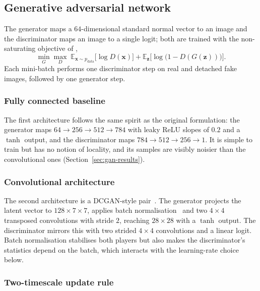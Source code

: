 \documentclass[11pt,a4paper]{article}
\begin{document}
\subsection{Generative adversarial network}
\label{sec:gan}

The generator maps a $64$-dimensional standard normal vector to an image and the discriminator
maps an image to a single logit; both are trained with the non-saturating objective of
\parencite{gan2014},
\begin{equation}
  \min_G \max_D \; \mathbb{E}_{\mathbf{x}\sim p_{\text{data}}}\big[\log D(\mathbf{x})\big]
  + \mathbb{E}_{\mathbf{z}}\big[\log\big(1-D(G(\mathbf{z}))\big)\big].
  \label{eq:gan}
\end{equation}
Each mini-batch performs one discriminator step on real and detached fake images, followed by
one generator step.

\subsubsection{Fully connected baseline}

The first architecture follows the same spirit as the original formulation: the generator maps
$64\to256\to512\to784$ with leaky ReLU slopes of $0.2$ and a $\tanh$ output, and the
discriminator maps $784\to512\to256\to1$.
It is simple to train but has no notion of locality, and its samples are visibly noisier than
the convolutional ones (Section~\ref{sec:gan-results}).

\subsubsection{Convolutional architecture}

The second architecture is a DCGAN-style pair~\parencite{dcgan2016}. The generator projects
the latent vector to $128\times7\times7$, applies batch normalisation~\parencite{bn2015} and
two $4\times4$ transposed convolutions with stride $2$, reaching $28\times28$ with a $\tanh$
output. The discriminator mirrors this with two strided $4\times4$ convolutions and a linear
logit. Batch normalisation stabilises both players but also makes the discriminator's
statistics depend on the batch, which interacts with the learning-rate choice below.

\subsubsection{Two-timescale update rule}
\end{document}

